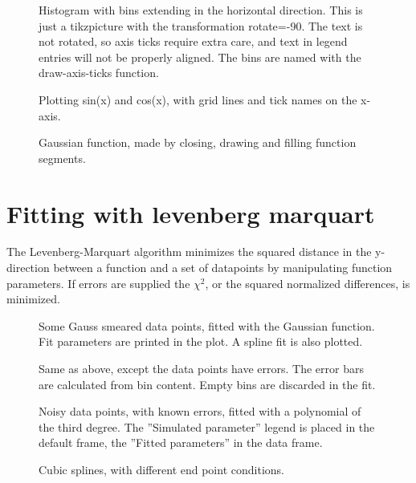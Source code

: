 \documentclass{article}
\begin{document}
\begin{figure}[H]
\centering

\captionsetup{singlelinecheck=off}
\caption[asdf]{Histogram with bins extending in the horizontal direction. 
This is just a tikzpicture with the transformation rotate=-90. The text is not rotated, so axis ticks
require extra care, and text in legend entries will not be properly aligned.
The bins are named with the draw-axis-ticks function.}
\end{figure}
\begin{figure}[H]
\centering

\captionsetup{singlelinecheck=off}
\caption[asdf]{Plotting sin(x) and cos(x), with grid lines and tick names on the x-axis.}
\end{figure}
\begin{figure}[H]
\centering

\captionsetup{singlelinecheck=off}
\caption[asdf]{Gaussian function, made by closing, drawing and filling function segments.}
\end{figure}
\section{Fitting with levenberg marquart}


The Levenberg-Marquart algorithm minimizes the squared distance in the y-direction
between a function and a set of datapoints by manipulating function parameters. 
If errors are supplied the $\chi^2$, or the squared normalized differences, is minimized.

\begin{figure}[H]
\centering

\captionsetup{singlelinecheck=off}
\caption[asdf]{Some Gauss smeared data points, fitted with the Gaussian function. Fit parameters are printed in the plot. 
A spline fit is also plotted.}
\end{figure}
\begin{figure}[H]
\centering

\captionsetup{singlelinecheck=off}
\caption[asdf]{Same as above, except the data points have errors. The error bars are calculated from bin content.
Empty bins are discarded in the fit.}
\end{figure}
\begin{figure}[H]
\centering

\captionsetup{singlelinecheck=off}
\caption[asdf]{Noisy data points, with known errors, fitted with a polynomial of the third degree. 
The ''Simulated parameter'' legend is placed in the default frame, the ''Fitted parameters'' 
in the data frame.}
\end{figure}
\begin{figure}[H]
\centering

\captionsetup{singlelinecheck=off}
\caption[asdf]{Cubic splines, with different end point conditions.}
\end{figure}
\end{document}
